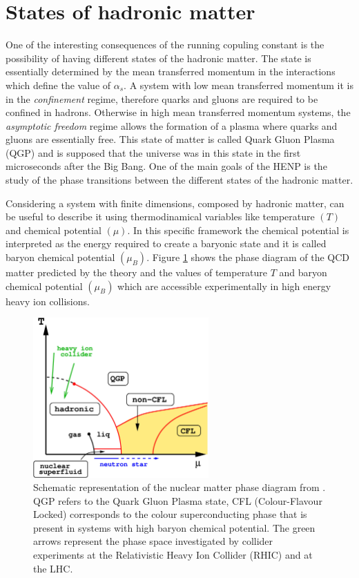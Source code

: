 %
%
\section{States of hadronic matter}
\label{sec:1.2}

One of the interesting consequences of the running copuling constant is the possibility of having
different states of the hadronic matter. The state is essentially determined by the mean transferred 
momentum in the interactions which define the value of $\alpha_{s}$. 
A system with low mean transferred momentum it is in the \textit{confinement} regime, therefore quarks
and gluons are required to be confined in hadrons. Otherwise in high mean transferred momentum systems,
the \textit{asymptotic freedom} regime allows the formation of a plasma where quarks and gluons are
essentially free. This state of matter is called Quark Gluon Plasma (QGP) and is supposed that the 
universe was in this state in the first microseconds after the Big Bang.
One of the main goals of the HENP is the study of the phase transitions between the different
states of the hadronic matter.

Considering a system with finite dimensions, composed by hadronic matter, can be useful to describe it 
using thermodinamical variables like temperature $(T)$ and chemical potential $(\mu)$. In this
specific framework the chemical potential is interpreted as the energy required to create a 
baryonic state and it is called baryon chemical potential $(\mu_{B})$. 
Figure \ref{fig:qgpdiagram} shows the phase diagram of the QCD matter predicted by the theory and 
the values of temperature $T$ and baryon chemical potential $(\mu_{B})$ which are accessible
experimentally in high energy heavy ion collisions.

\begin{figure}
    \centering
    \includegraphics[width=0.6\textwidth]{gfx/qgpphase}
	\caption{Schematic representation of the nuclear matter phase diagram from \cite{qgpphase}. QGP refers to the Quark Gluon Plasma state, CFL (Colour-Flavour Locked) corresponds to the colour superconducting phase that is present in systems with high baryon chemical potential. The green arrows represent the phase space investigated by collider experiments at the Relativistic Heavy Ion Collider (RHIC) and at the LHC.}
	\label{fig:qgpdiagram}
\end{figure}

